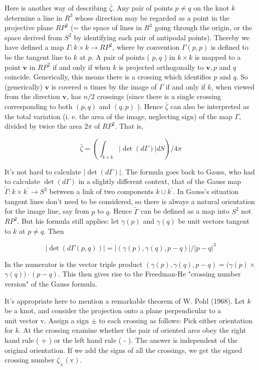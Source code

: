 \documentclass[10pt, letterpaper]{article}
\begin{document}
Here is another way of describing $\bar{\zeta}$. Any pair of points $p \neq q$ on the knot $k$ determine a line in $R^{3}$ whose direction may be regarded as a point in the projective plane $R P^{2}$ (= the space of lines in $R^{3}$ going through the origin, or the space derived from $S^{2}$ by identifying each pair of antipodal points). Thereby we have defined a map $\Gamma: k \times k \rightarrow R P^{2}$, where by convention $\Gamma(p, p)$ is defined to be the tangent line to $k$ at $p$. A pair of points ( $p, q$ ) in $k \times k$ is mapped to a point $\mathbf{v}$ in $R P^{2}$ if and only if when $k$ is projected orthogonally to $\mathbf{v}, p$ and $q$ coincide. Generically, this means there is a crossing which identifies $p$ and $q$. So (generically) $\mathbf{v}$ is covered $n$ times by the image of $\Gamma$ if and only if $k$, when viewed from the direction $\mathbf{v}$, has $n / 2$ crossings (since there is a single crossing corresponding to both $(p, q)$ and $(q, p)$ ). Hence $\bar{\zeta}$ can also be interpreted as the total variation (i. e. the area of the image, neglecting sign) of the map $\Gamma$, divided by twice the area $2 \pi$ of $R P^{2}$. That is,

$$
\bar{\zeta}=\left(\int_{k \times k}|\operatorname{det}(d \Gamma)| d S\right) / 4 \pi
$$

It's not hard to calculate $|\operatorname{det}(d \Gamma)|$. The formula goes back to Gauss, who had to calculate $\operatorname{det}(d \Gamma)$ in a slightly different context, that of the Gauss map $\tilde{\Gamma}: k \times k^{\prime} \rightarrow S^{2}$ between a link of two components $k \cup k^{\prime}$. In Gauss's situation tangent lines don't need to be considered, so there is always a natural orientation for the image line, say from $p$ to $q$. Hence $\tilde{\Gamma}$ can be defined as a map into $S^{2}$ not $R P^{2}$. But his formula still applies: let $\gamma(p)$ and $\gamma(q)$ be unit vectors tangent to $k$ at $p \neq q$. Then

$$
|\operatorname{det}(d \Gamma(p, q))|=|(\gamma(p), \gamma(q), p-q)| /|p-q|^{3}
$$

In the numerator is the vector triple product $(\gamma(p), \gamma(q), p-q)=(\gamma(p) \times$ $\gamma(q)) \cdot(p-q)$. This then gives rise to the Freedman-He "crossing number version" of the Gauss formula.

It's appropriate here to mention a remarkable theorem of W. Pohl (1968). Let $k$ be a knot, and consider the projection onto a plane perpendicular to a\\
unit vector v. Assign a sign $\pm$ to each crossing as follows: Pick either orientation for $k$. At the crossing examine whether the pair of oriented arcs obey the right hand rule ( + ) or the left hand rule ( - ). The answer is independent of the original orientation. If we add the signs of all the crossings, we get the signed crossing number $\zeta_{ \pm}(\mathrm{v})$.
\end{document}
